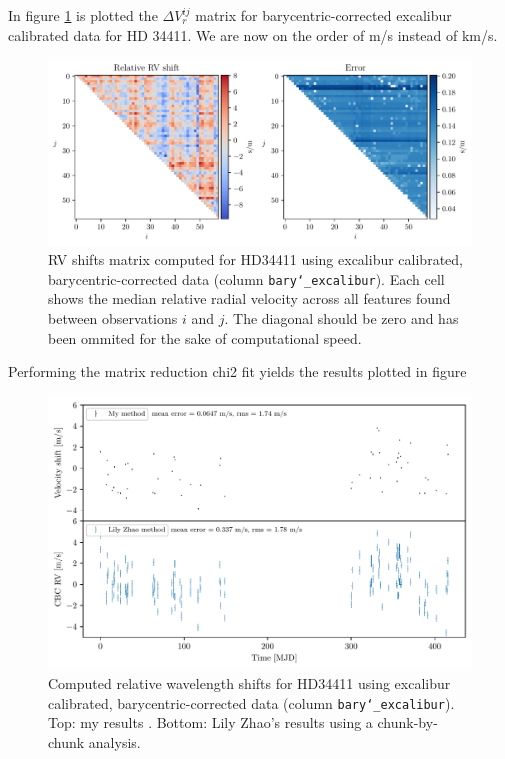 
In figure \ref*{fig:shift_matrix_barycentric} is plotted the $\Delta V_r^{ij}$ matrix for barycentric-corrected excalibur calibrated data for HD 34411. We are now on the order of m/s instead of km/s.

\begin{figure}%
    \begin{wide}  
        \includegraphics[width=\textwidth]{figures/shfits_matrix_bary.pdf}
        \caption{RV shifts matrix computed for HD34411 using excalibur calibrated, barycentric-corrected data (column \texttt{bary\char`_excalibur}). Each cell shows the median relative radial velocity across all features found between observations $i$ and $j$. The diagonal should be zero and has been ommited for the sake of computational speed.}
        \label{fig:shift_matrix_barycentric}
    \end{wide}
\end{figure}

Performing the matrix reduction chi2 fit yields the results plotted in figure 

\begin{figure}%
    \begin{wide}  
        \includegraphics[width=\textwidth]{figures/HD34411_barycentric_rv_vs_lily.pdf}
        \caption{Computed relative wavelength shifts for HD34411 using excalibur calibrated, barycentric-corrected data (column \texttt{bary\char`_excalibur}). Top: my results . Bottom: Lily Zhao's results using a chunk-by-chunk analysis. }
        \label{fig:RV_results_barycentric}
    \end{wide}
\end{figure}



